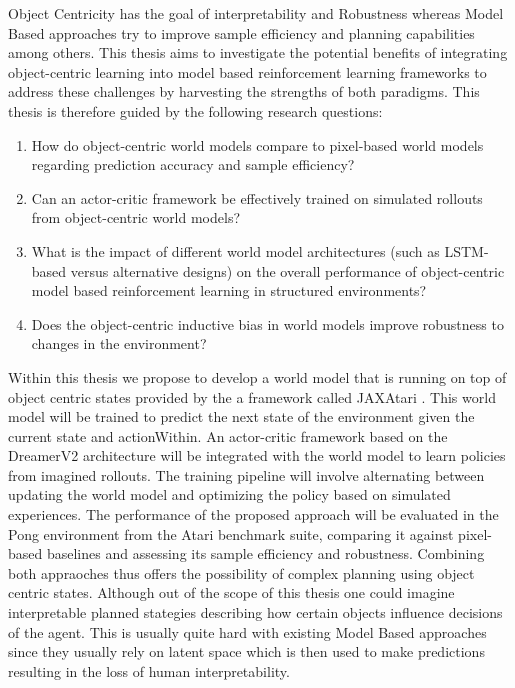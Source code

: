 \documentclass[
	english,
	ruledheaders=section,
	class=report,
	thesis={type=master},
	accentcolor=9c,
	custommargins=true,
	marginpar=false,
	parskip=half-,
	fontsize=11pt,
]{tudapub}
\begin{document}
Object Centricity has the goal of 
interpretability and Robustness whereas Model Based approaches try to improve
sample efficiency and planning capabilities among others. This
thesis aims to investigate the potential benefits of integrating object-centric
learning into model based reinforcement learning frameworks to address these
challenges by harvesting the strengths of both paradigms. This thesis is
therefore guided by the following research questions:
\begin{enumerate}
	\item How do object-centric world models compare to pixel-based world models
	      regarding prediction accuracy and sample efficiency?
	\item Can an actor-critic framework be effectively trained on simulated rollouts from
	      object-centric world models?
	\item What is the impact of different world model architectures (such as LSTM-based
	      versus alternative designs) on the overall performance of object-centric
	      model based reinforcement learning in structured environments?
	\item Does the object-centric inductive bias in world models improve robustness to
	      changes in the environment?
\end{enumerate}

Within this thesis we propose to develop a world model that is running on top
of object centric states provided by the a framework called JAXAtari \cite{jaxatari}. This world model will be trained to predict 
the next
state of the environment given the current state and actionWithin. An actor-critic
framework based on the DreamerV2 \cite{hafner2020dream} architecture will be integrated with the world
model to learn policies from imagined rollouts. The training pipeline will
involve alternating between updating the world model and optimizing the policy
based on simulated experiences. The performance of the proposed approach will
be evaluated in the Pong environment from the Atari benchmark suite, comparing
it against pixel-based baselines and assessing its sample efficiency and
robustness. Combining both appraoches thus offers the possibility of complex planning
using object centric states. Although out of the scope of this thesis one could imagine interpretable
planned stategies describing how certain objects influence decisions of the agent. This is usually quite hard
with existing Model Based approaches since they usually rely on latent space which is then used to make predictions
resulting in the loss of human interpretability.
\end{document}
